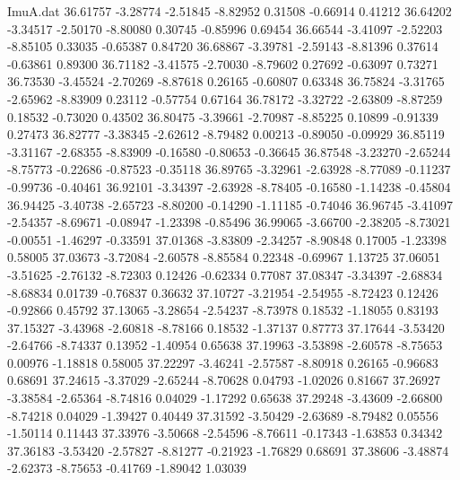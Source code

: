 \begin{filecontents}{ImuA.dat}
  36.61757   -3.28774   -2.51845   -8.82952    0.31508   -0.66914    0.41212
  36.64202   -3.34517   -2.50170   -8.80080    0.30745   -0.85996    0.69454
  36.66544   -3.41097   -2.52203   -8.85105    0.33035   -0.65387    0.84720
  36.68867   -3.39781   -2.59143   -8.81396    0.37614   -0.63861    0.89300
  36.71182   -3.41575   -2.70030   -8.79602    0.27692   -0.63097    0.73271
  36.73530   -3.45524   -2.70269   -8.87618    0.26165   -0.60807    0.63348
  36.75824   -3.31765   -2.65962   -8.83909    0.23112   -0.57754    0.67164
  36.78172   -3.32722   -2.63809   -8.87259    0.18532   -0.73020    0.43502
  36.80475   -3.39661   -2.70987   -8.85225    0.10899   -0.91339    0.27473
  36.82777   -3.38345   -2.62612   -8.79482    0.00213   -0.89050   -0.09929
  36.85119   -3.31167   -2.68355   -8.83909   -0.16580   -0.80653   -0.36645
  36.87548   -3.23270   -2.65244   -8.75773   -0.22686   -0.87523   -0.35118
  36.89765   -3.32961   -2.63928   -8.77089   -0.11237   -0.99736   -0.40461
  36.92101   -3.34397   -2.63928   -8.78405   -0.16580   -1.14238   -0.45804
  36.94425   -3.40738   -2.65723   -8.80200   -0.14290   -1.11185   -0.74046
  36.96745   -3.41097   -2.54357   -8.69671   -0.08947   -1.23398   -0.85496
  36.99065   -3.66700   -2.38205   -8.73021   -0.00551   -1.46297   -0.33591
  37.01368   -3.83809   -2.34257   -8.90848    0.17005   -1.23398    0.58005
  37.03673   -3.72084   -2.60578   -8.85584    0.22348   -0.69967    1.13725
  37.06051   -3.51625   -2.76132   -8.72303    0.12426   -0.62334    0.77087
  37.08347   -3.34397   -2.68834   -8.68834    0.01739   -0.76837    0.36632
  37.10727   -3.21954   -2.54955   -8.72423    0.12426   -0.92866    0.45792
  37.13065   -3.28654   -2.54237   -8.73978    0.18532   -1.18055    0.83193
  37.15327   -3.43968   -2.60818   -8.78166    0.18532   -1.37137    0.87773
  37.17644   -3.53420   -2.64766   -8.74337    0.13952   -1.40954    0.65638
  37.19963   -3.53898   -2.60578   -8.75653    0.00976   -1.18818    0.58005
  37.22297   -3.46241   -2.57587   -8.80918    0.26165   -0.96683    0.68691
  37.24615   -3.37029   -2.65244   -8.70628    0.04793   -1.02026    0.81667
  37.26927   -3.38584   -2.65364   -8.74816    0.04029   -1.17292    0.65638
  37.29248   -3.43609   -2.66800   -8.74218    0.04029   -1.39427    0.40449
  37.31592   -3.50429   -2.63689   -8.79482    0.05556   -1.50114    0.11443
  37.33976   -3.50668   -2.54596   -8.76611   -0.17343   -1.63853    0.34342
  37.36183   -3.53420   -2.57827   -8.81277   -0.21923   -1.76829    0.68691
  37.38606   -3.48874   -2.62373   -8.75653   -0.41769   -1.89042    1.03039

\end{filecontents}
